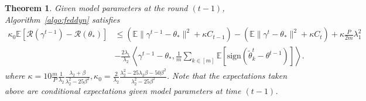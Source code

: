 \documentclass{article} %
\newtheorem{theorem}{Theorem}[section]
\begin{document}
\begin{theorem}\label{convergence_lemma}
Given model parameters at the round $(t-1)$, Algorithm~\ref{algo:feddyn} satisfies 
\begin{align*}
    \kappa_0\mathbb{E}[\mathcal{R}(\gamma^{t-1})-\mathcal{R}(\theta_*)]&\le (\mathbb{E}\lVert  \gamma^{t-1}-\theta_* \rVert^2+\kappa C_{t-1})-(\mathbb{E}\lVert \gamma^t -\theta_*\rVert^2+\kappa C_t)+\kappa\frac{P}{2m}\lambda_1^2\\
    &-\frac{2\lambda_1}{\lambda_2 }\left\langle \gamma^{t-1}-\theta_*,\frac{1}{m}\sum_{k\in [m]}\mathbb{E}[\mathrm{sign}(\tilde{\theta}_k^t-\theta^{t-1})]\right\rangle.
\end{align*}
where $\kappa=10\frac{m}{P}\frac{1}{\lambda_2}\frac{\lambda_2+\beta}{\lambda_2^2-25\beta^2},\kappa_0=\frac{2}{\lambda_2}\frac{\lambda_2^2-25\lambda_2\beta-50\beta^2}{\lambda_2^2-25\beta^2}$. Note that the expectations taken above are conditional expectations given model parameters at time $(t-1)$.
\end{theorem}
\end{document}
